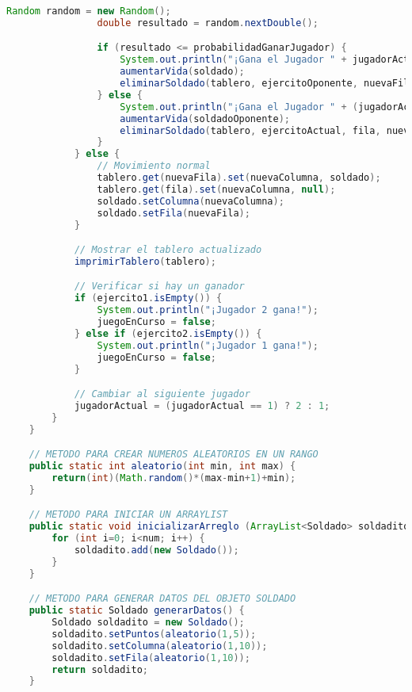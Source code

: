 \documentclass{article}
\begin{document}
\begin{itemize}
\begin{lstlisting}[language=java]
                Random random = new Random();
                double resultado = random.nextDouble();

                if (resultado <= probabilidadGanarJugador) {
                    System.out.println("¡Gana el Jugador " + jugadorActual + "!");
                    aumentarVida(soldado);
                    eliminarSoldado(tablero, ejercitoOponente, nuevaFila, nuevaColumna);
                } else {
                    System.out.println("¡Gana el Jugador " + (jugadorActual == 1 ? 2 : 1) + "!");
                    aumentarVida(soldadoOponente);
                    eliminarSoldado(tablero, ejercitoActual, fila, nuevaColumna);
                }
            } else {
                // Movimiento normal
                tablero.get(nuevaFila).set(nuevaColumna, soldado);
                tablero.get(fila).set(nuevaColumna, null);
                soldado.setColumna(nuevaColumna);
                soldado.setFila(nuevaFila);
            }

            // Mostrar el tablero actualizado
            imprimirTablero(tablero);

            // Verificar si hay un ganador
            if (ejercito1.isEmpty()) {
                System.out.println("¡Jugador 2 gana!");
                juegoEnCurso = false;
            } else if (ejercito2.isEmpty()) {
                System.out.println("¡Jugador 1 gana!");
                juegoEnCurso = false;
            }

            // Cambiar al siguiente jugador
            jugadorActual = (jugadorActual == 1) ? 2 : 1;
        }
	}

	// METODO PARA CREAR NUMEROS ALEATORIOS EN UN RANGO
	public static int aleatorio(int min, int max) {
		return(int)(Math.random()*(max-min+1)+min);
	}

	// METODO PARA INICIAR UN ARRAYLIST
	public static void inicializarArreglo (ArrayList<Soldado> soldadito, int num) {
		for (int i=0; i<num; i++) {
			soldadito.add(new Soldado());
		}
	}

	// METODO PARA GENERAR DATOS DEL OBJETO SOLDADO
	public static Soldado generarDatos() {
		Soldado soldadito = new Soldado();
		soldadito.setPuntos(aleatorio(1,5));
		soldadito.setColumna(aleatorio(1,10));
		soldadito.setFila(aleatorio(1,10));
		return soldadito;
	}


\end{lstlisting}
\end{itemize}
\end{document}

